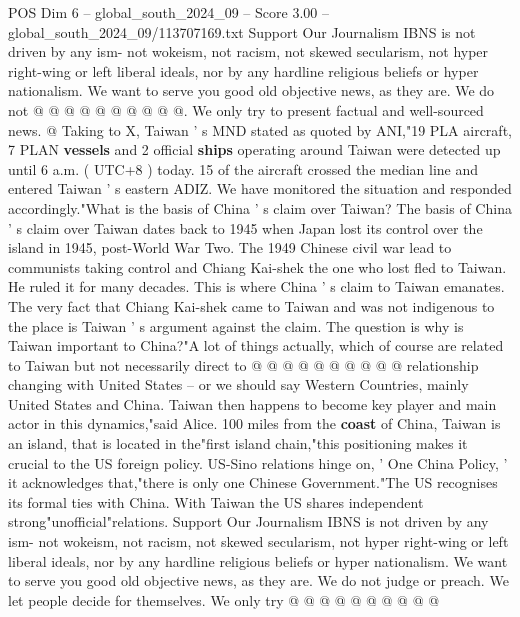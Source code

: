\begin{textsample}{POS Dim 6 – global\_south\_2024\_09 – Score 3.00 – global\_south\_2024\_09/113707169.txt}
Support Our Journalism IBNS is not driven by any ism- not wokeism, not racism, not skewed secularism, not hyper right-wing or left liberal ideals, nor by any hardline religious beliefs or hyper nationalism.
We want to serve you good old objective news, as they are.
We do not @ @ @ @ @ @ @ @ @ @.
We only try to present factual and well-sourced news. @ Taking to X, Taiwan ' s MND stated as quoted by ANI,"19 PLA aircraft, 7 PLAN \textbf{vessels} and 2 official \textbf{ships} operating around Taiwan were detected up until 6 a.m. ( UTC+8 ) today. 15 of the aircraft crossed the median line and entered Taiwan ' s eastern ADIZ.
We have monitored the situation and responded accordingly."What is the basis of China ' s claim over Taiwan?
The basis of China ' s claim over Taiwan dates back to 1945 when Japan lost its control over the island in 1945, post-World War Two.
The 1949 Chinese civil war lead to communists taking control and Chiang Kai-shek the one who lost fled to Taiwan.
He ruled it for many decades.
This is where China ' s claim to Taiwan emanates.
The very fact that Chiang Kai-shek came to Taiwan and was not indigenous to the place is Taiwan ' s argument against the claim.
The question is why is Taiwan important to China?"A lot of things actually, which of course are related to Taiwan but not necessarily direct to @ @ @ @ @ @ @ @ @ @ relationship changing with United States -- or we should say Western Countries, mainly United States and China.
Taiwan then happens to become key player and main actor in this dynamics,"said Alice. 100 miles from the \textbf{coast} of China, Taiwan is an island, that is located in the"first island chain,"this positioning makes it crucial to the US foreign policy.
US-Sino relations hinge on, ' One China Policy, ' it acknowledges that,"there is only one Chinese Government."The US recognises its formal ties with China.
With Taiwan the US shares independent strong"unofficial"relations.
Support Our Journalism IBNS is not driven by any ism- not wokeism, not racism, not skewed secularism, not hyper right-wing or left liberal ideals, nor by any hardline religious beliefs or hyper nationalism.
We want to serve you good old objective news, as they are.
We do not judge or preach.
We let people decide for themselves.
We only try @ @ @ @ @ @ @ @ @ @

\end{textsample}

